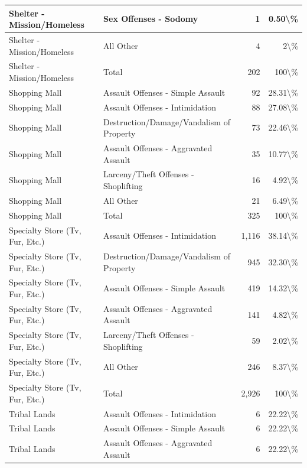 \documentclass[
]{krantz}
\begin{document}
\begin{longtable}[t]{l|l|r|r}
\hline
Shelter - Mission/Homeless & Sex Offenses - Sodomy & 1 & 0.50\textbackslash{}\%\\
\hline
Shelter - Mission/Homeless & All Other & 4 & 2\textbackslash{}\%\\
\hline
Shelter - Mission/Homeless & Total & 202 & 100\textbackslash{}\%\\
\hline
Shopping Mall & Assault Offenses - Simple Assault & 92 & 28.31\textbackslash{}\%\\
\hline
Shopping Mall & Assault Offenses - Intimidation & 88 & 27.08\textbackslash{}\%\\
\hline
Shopping Mall & Destruction/Damage/Vandalism of Property & 73 & 22.46\textbackslash{}\%\\
\hline
Shopping Mall & Assault Offenses - Aggravated Assault & 35 & 10.77\textbackslash{}\%\\
\hline
Shopping Mall & Larceny/Theft Offenses - Shoplifting & 16 & 4.92\textbackslash{}\%\\
\hline
Shopping Mall & All Other & 21 & 6.49\textbackslash{}\%\\
\hline
Shopping Mall & Total & 325 & 100\textbackslash{}\%\\
\hline
Specialty Store (Tv, Fur, Etc.) & Assault Offenses - Intimidation & 1,116 & 38.14\textbackslash{}\%\\
\hline
Specialty Store (Tv, Fur, Etc.) & Destruction/Damage/Vandalism of Property & 945 & 32.30\textbackslash{}\%\\
\hline
Specialty Store (Tv, Fur, Etc.) & Assault Offenses - Simple Assault & 419 & 14.32\textbackslash{}\%\\
\hline
Specialty Store (Tv, Fur, Etc.) & Assault Offenses - Aggravated Assault & 141 & 4.82\textbackslash{}\%\\
\hline
Specialty Store (Tv, Fur, Etc.) & Larceny/Theft Offenses - Shoplifting & 59 & 2.02\textbackslash{}\%\\
\hline
Specialty Store (Tv, Fur, Etc.) & All Other & 246 & 8.37\textbackslash{}\%\\
\hline
Specialty Store (Tv, Fur, Etc.) & Total & 2,926 & 100\textbackslash{}\%\\
\hline
Tribal Lands & Assault Offenses - Intimidation & 6 & 22.22\textbackslash{}\%\\
\hline
Tribal Lands & Assault Offenses - Simple Assault & 6 & 22.22\textbackslash{}\%\\
\hline
Tribal Lands & Assault Offenses - Aggravated Assault & 6 & 22.22\textbackslash{}\%\\

\end{longtable}
\end{document}
